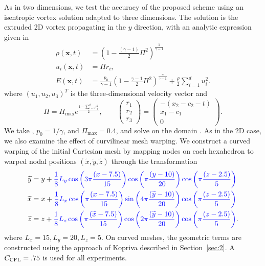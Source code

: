 \documentclass[review,onefignum,onetabnum,final]{siamart171218}
\renewcommand{\tilde}{\widetilde}
\newcommand{\LRp}[1]{\left( #1 \right)}
\newcommand{\note}[1]{{\color{blue}{#1}}}
\begin{document}
As in two dimensions, we test the accuracy of the proposed scheme using an isentropic vortex solution adapted to three dimensions.  The solution is the extruded 2D vortex propagating in the $y$ direction, with an analytic expression given in \cite{williams2013nodal}
\begin{align*}
\rho(\bm{x},t) &= \LRp{1-\frac{(\gamma-1)}{2}\Pi^2}^{\frac{1}{\gamma-1}}\\
u_i(\bm{x},t) &= \Pi r_i, \\
E(\bm{x},t) &= \frac{p_0}{\gamma-1}\LRp{1-\frac{\gamma-1}{2}\Pi^2}^{\frac{\gamma}{\gamma-1}} + \frac{\rho}{2}\sum_{i=1}^d u_i^2.
\end{align*}
where $(u_1,u_2,u_3)^T$ is the three-dimensional velocity vector and %
\[
\Pi = \Pi_{\max}e^{\frac{1-\sum_{i=1}^dr_i^2}{2}}, \qquad \begin{pmatrix}r_1\\r_2\\r_3\end{pmatrix} = \begin{pmatrix}
-(x_2-c_2-t)\\
x_1-c_1\\
0
\end{pmatrix}.
\]
We take \note{$c_1 = c_2 = 7.5$}, $p_0 = {1}/{\gamma}$, and $\Pi_{\max} = 0.4$, and solve on the domain \note{$[0,15]\times [0,20]\times [0,5]$ until final time $T=5$.  We decompose the domain into uniform hexahedral elements with edge length $h$}.  As in the 2D case, we also examine the effect of curvilinear mesh warping.  We construct a curved warping of the initial Cartesian mesh by mapping nodes on each hexahedron to warped nodal positions $(\tilde{x},\tilde{y},\tilde{z})$ through the transformation
\begin{align*}
\tilde{y} &= y + \note{\frac{1}{8}L_y\cos\LRp{3\pi \frac{(x-7.5)}{15}}\cos\LRp{\pi \frac{(y-10)}{20}}\cos\LRp{\pi \frac{(z-2.5)}{5}}}\\
\tilde{x} &= x + \note{\frac{1}{8}L_x\cos\LRp{\pi \frac{(x-7.5)}{15}}\sin\LRp{4\pi \frac{(\tilde{y}-10)}{20}}\cos\LRp{\pi \frac{(z-2.5)}{5}}}\\
\tilde{z} &= z + \note{\frac{1}{8}L_z\cos\LRp{\pi \frac{(\tilde{x}-7.5)}{15}}\cos\LRp{2\pi \frac{(\tilde{y}-10)}{20}}\cos\LRp{\pi \frac{(z-2.5)}{5}}}.
\end{align*} 
where $L_x = 15, L_y = 20, L_z = 5$.  
On curved meshes, the geometric terms are constructed using the approach of Kopriva described in Section~\ref{sec:2}.  A $C_{\rm CFL} = .75$ is used for all experiments.  
\end{document}
